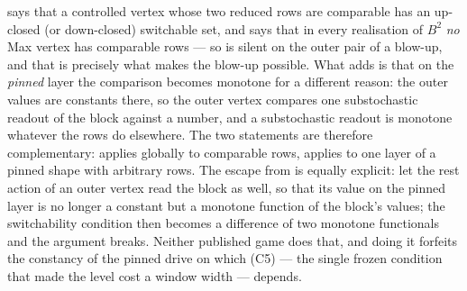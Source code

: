 \begin{remark}\label{rs:vs-rows-turn}
 says that a controlled vertex whose two reduced rows are
comparable has an up-closed (or down-closed) switchable set, and
 says that in every realisation of $B^{2}$ \emph{no} Max
vertex has comparable rows --- so  is silent on the outer
pair of a blow-up, and that is precisely what makes the blow-up possible. What
 adds is that on the \emph{pinned} layer the comparison
becomes monotone for a different reason: the outer values are constants there,
so the outer vertex compares one substochastic readout of the block against a
number, and a substochastic readout is monotone whatever the rows do elsewhere.
The two statements are therefore complementary:  applies
globally to comparable rows,  applies to one layer of a
pinned shape with arbitrary rows. The escape from  is equally
explicit: let the rest action of an outer vertex read the block as well, so
that its value on the pinned layer is no longer a constant but a monotone
function of the block's values; the switchability condition then becomes a
difference of two monotone functionals and the argument breaks. Neither
published game does that, and doing it forfeits the constancy of the pinned
drive on which (C5) --- the single frozen condition that made the
level cost a window width --- depends.
\end{remark}